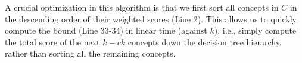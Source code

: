 A crucial optimization in this algorithm is that we first sort
all concepts in $C$ in the descending order of their weighted scores (Line 2).
This allows us to quickly
compute the bound (Line 33-34) in linear time (against $k$), i.e., simply
compute the total score of the next $k-ck$ concepts down the decision
tree hierarchy, rather than sorting all the remaining concepts.

